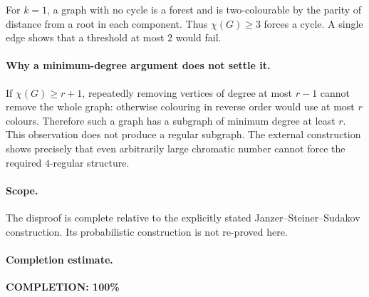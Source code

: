 For \(k=1\), a graph with no cycle is a forest and is two-colourable
by the parity of distance from a root in each component. Thus
\(\chi(G)\geq3\) forces a cycle. A single edge shows that a threshold
at most \(2\) would fail.

\paragraph{Why a minimum-degree argument does not settle it.}
If \(\chi(G)\geq r+1\), repeatedly removing vertices of degree at most
\(r-1\) cannot remove the whole graph: otherwise colouring in reverse
order would use at most \(r\) colours. Therefore such a graph has a
subgraph of minimum degree at least \(r\).
This observation does not produce a regular subgraph. The external
construction shows precisely that even arbitrarily large chromatic
number cannot force the required \(4\)-regular structure.

\paragraph{Scope.}
The disproof is complete relative to the explicitly stated
Janzer--Steiner--Sudakov construction. Its probabilistic construction
is not re-proved here.

\paragraph{Completion estimate.}
\textbf{COMPLETION: 100\%}
